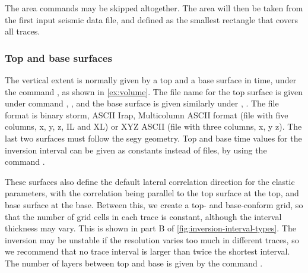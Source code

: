 The area commands may be skipped altogether. The area will then be taken from the first input seismic data file, and defined as the smallest rectangle that covers all traces.

\subsubsection{Top and base surfaces}
The vertical extent is normally given by a top and a base surface in
time, under the command 
, as shown in \autoref{ex:volume}. The
file name for the top surface is given under command
, , and the base
surface is given similarly under 
, . The file format is binary
storm, ASCII Irap, Multicolumn ASCII format (file with five columns,
x, y, z, IL and XL) or XYZ ASCII (file with three columns, x, y z). The last two surfaces must follow the segy geometry. Top and base time values for the inversion
interval can be given as constants instead of files, by using the
command .   

These surfaces also define the default lateral correlation direction
for the elastic parameters, with the correlation being parallel to the
top surface at the top, and base surface at the base. Between this, we
create a top- and base-conform grid, so that the number of grid cells
in each trace is constant, although the interval thickness may
vary. This is shown in part B of
\autoref{fig:inversion-interval-types}. The inversion may be unstable
if the resolution varies too much in different traces, so we recommend
that no trace interval is larger than twice the shortest interval. The
number of layers between top and base is given by the command
 .


